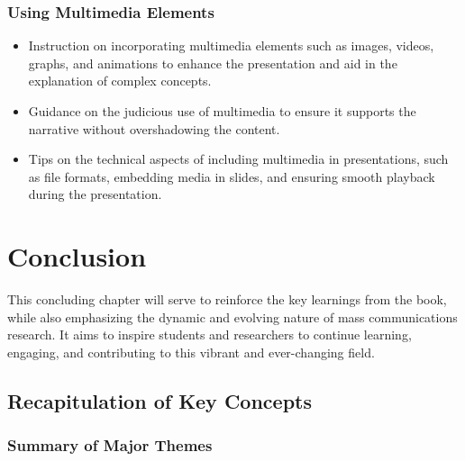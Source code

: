 \documentclass[
]{book}
\begin{document}
\hypertarget{using-multimedia-elements}{%
\subsection*{Using Multimedia Elements}\label{using-multimedia-elements}}

\begin{itemize}
\item
  Instruction on incorporating multimedia elements such as images, videos, graphs, and animations to enhance the presentation and aid in the explanation of complex concepts.
\item
  Guidance on the judicious use of multimedia to ensure it supports the narrative without overshadowing the content.
\item
  Tips on the technical aspects of including multimedia in presentations, such as file formats, embedding media in slides, and ensuring smooth playback during the presentation.
\end{itemize}

\hypertarget{conclusion}{%
\chapter*{Conclusion}\label{conclusion}}

This concluding chapter will serve to reinforce the key learnings from the book, while also emphasizing the dynamic and evolving nature of mass communications research. It aims to inspire students and researchers to continue learning, engaging, and contributing to this vibrant and ever-changing field.

\hypertarget{recapitulation-of-key-concepts}{%
\section*{Recapitulation of Key Concepts}\label{recapitulation-of-key-concepts}}

\hypertarget{summary-of-major-themes}{%
\subsection*{Summary of Major Themes}\label{summary-of-major-themes}}
\end{document}
